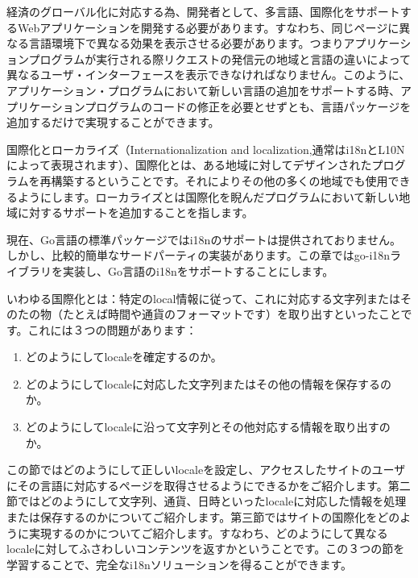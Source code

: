 経済のグローバル化に対応する為、開発者として、多言語、国際化をサポートするWebアプリケーションを開発する必要があります。すなわち、同じページに異なる言語環境下で異なる効果を表示させる必要があります。つまりアプリケーションプログラムが実行される際リクエストの発信元の地域と言語の違いによって異なるユーザ・インターフェースを表示できなければなりません。このように、アプリケーション・プログラムにおいて新しい言語の追加をサポートする時、アプリケーションプログラムのコードの修正を必要とせずとも、言語パッケージを追加するだけで実現することができます。

国際化とローカライズ（Internationalization and localization,通常はi18nとL10Nによって表現されます）、国際化とは、ある地域に対してデザインされたプログラムを再構築するということです。それによりその他の多くの地域でも使用できるようにします。ローカライズとは国際化を睨んだプログラムにおいて新しい地域に対するサポートを追加することを指します。

現在、Go言語の標準パッケージではi18nのサポートは提供されておりません。しかし、比較的簡単なサードパーティの実装があります。この章ではgo-i18nライブラリを実装し、Go言語のi18nをサポートすることにします。

いわゆる国際化とは：特定のlocal情報に従って、これに対応する文字列またはそのたの物（たとえば時間や通貨のフォーマットです）を取り出すといったことです。これには３つの問題があります：


\begin{enumerate}
  \item どのようにしてlocaleを確定するのか。
  \item どのようにしてlocaleに対応した文字列またはその他の情報を保存するのか。
  \item どのようにしてlocaleに沿って文字列とその他対応する情報を取り出すのか。
\end{enumerate}

この節ではどのようにして正しいlocaleを設定し、アクセスしたサイトのユーザにその言語に対応するページを取得させるようにできるかをご紹介します。第二節ではどのようにして文字列、通貨、日時といったlocaleに対応した情報を処理または保存するのかについてご紹介します。第三節ではサイトの国際化をどのように実現するのかについてご紹介します。すなわち、どのようにして異なるlocaleに対してふさわしいコンテンツを返すかということです。この３つの節を学習することで、完全なi18nソリューションを得ることができます。

